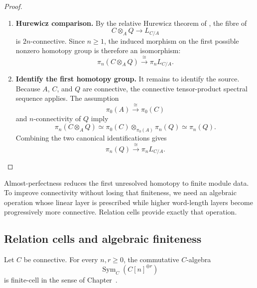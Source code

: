 \begin{proof}
\leavevmode
\begin{enumerate}[label=\textup{(\arabic*)}]
    \item \textbf{Hurewicz comparison.}
    By the relative Hurewicz theorem of
    , the fibre of
    \[
        C\otimes_AQ
        \longrightarrow
        L_{C/A}
    \]
    is \(2n\)-connective. Since \(n\geq1\), the induced morphism on the first
    possible nonzero homotopy group is therefore an isomorphism:
    \[
        \pi_n(C\otimes_AQ)
        \xrightarrow{\cong}
        \pi_nL_{C/A}.
    \]
    \item \textbf{Identify the first homotopy group.}
    It remains to identify the source. Because \(A\), \(C\), and \(Q\) are
    connective, the connective tensor-product spectral sequence applies. The
    assumption
    \[
        \pi_0(A)\xrightarrow{\cong}\pi_0(C)
    \]
    and \(n\)-connectivity of \(Q\) imply
    \[
        \pi_n(C\otimes_AQ)
        \simeq
        \pi_0(C)\otimes_{\pi_0(A)}\pi_n(Q)
        \simeq
        \pi_n(Q).
    \]
    Combining the two canonical identifications gives
    \[
        \pi_n(Q)
        \xrightarrow{\cong}
        \pi_nL_{C/A}.
    \]
\end{enumerate}
\end{proof}

Almost-perfectness reduces the first unresolved homotopy to finite module data. To
improve connectivity without losing that finiteness, we need an algebraic operation
whose linear layer is prescribed while higher word-length layers become progressively
more connective. Relation cells provide exactly that operation.

\subsection{Relation cells and algebraic finiteness}

\begin{lemma}
\label{lem:suspended-free-algebras-finite-cell}
Let \(C\) be connective. For every \(n,r\geq0\), the commutative
\(C\)-algebra
\[
    \operatorname{Sym}_C(C[n]^{\oplus r})
\]
is finite-cell in the sense of Chapter~.
\end{lemma}

